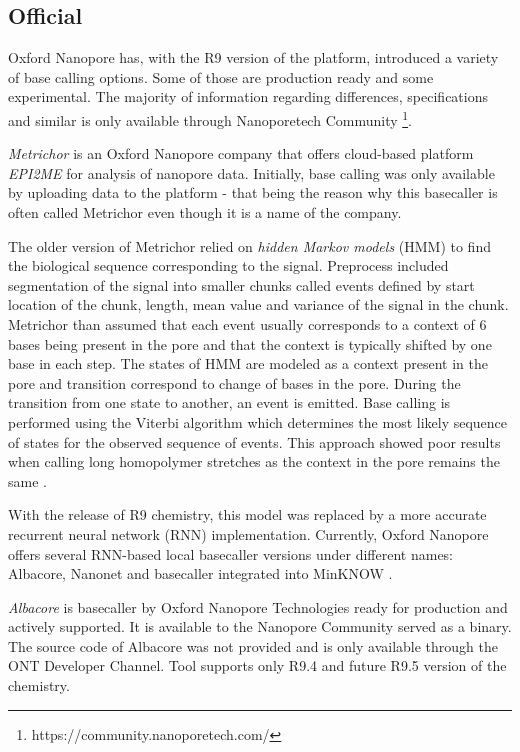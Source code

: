 \documentclass[times, utf8, diplomski, numeric, english]{fer}
\begin{document}
\subsection{Official}
Oxford Nanopore has, with the R9 version of the platform, introduced a variety of base calling options. Some of those are production ready and some experimental. The majority of information regarding differences, specifications and similar is only available through Nanoporetech Community \footnote{https://community.nanoporetech.com/}.


\textit{Metrichor} is an Oxford Nanopore company that offers cloud-based platform \textit{EPI2ME} for analysis of nanopore data. 
Initially, base calling was only available by uploading data to the platform - that being the reason why this basecaller is often called Metrichor even though it is a name of the company.

The older version of Metrichor relied on \textit{hidden Markov models} (HMM) to find the biological sequence corresponding to the signal. Preprocess included segmentation of the signal into smaller chunks called events defined by start location of the chunk, length, mean value and variance of the signal in the chunk. Metrichor than assumed that each event usually corresponds to a context of 6 bases being present in the pore and that the context is typically shifted by one base in each step. 
The states of HMM are modeled as a context present in the pore and transition correspond to change of bases in the pore. During the transition from one state to another, an event is emitted. Base calling is performed using the Viterbi algorithm which determines the most likely sequence of states for the observed sequence of events. This approach showed poor results when calling long homopolymer stretches as the context in the pore remains the same \cite{homopolymers}\cite{homopolimeri_analiza}.

With the release of R9 chemistry, this model was replaced by a more accurate recurrent neural network (RNN) implementation. Currently, Oxford Nanopore offers several RNN-based local basecaller versions under different names: Albacore, Nanonet and basecaller integrated into MinKNOW \cite{ont-basecallers}.   

\textit{Albacore} is basecaller by Oxford Nanopore Technologies ready for production and actively supported.
It is available to the Nanopore Community served as a binary. The source code of Albacore was not provided and is only available through the ONT Developer Channel. Tool supports only R9.4 and future R9.5 version of the chemistry.
\end{document}
